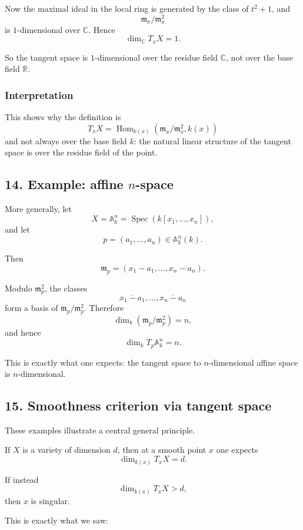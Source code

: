 \documentclass[12pt,a4paper]{article}
\theoremstyle{plain}
\theoremstyle{definition}      %
\begin{document}
	Now the maximal ideal in the local ring is generated by the class of \(t^2+1\), and
	\[
	\mathfrak m_x/\mathfrak m_x^2
	\]
	is \(1\)-dimensional over \(\mathbb C\). Hence
	\[
	\dim_{\mathbb C} T_xX=1.
	\]
	
	So the tangent space is \(1\)-dimensional over the residue field \(\mathbb C\), not over the base field \(\mathbb R\).
	
	\subsubsection*{Interpretation}
	
	This shows why the definition is
	\[
	T_xX=\operatorname{Hom}_{k(x)}(\mathfrak m_x/\mathfrak m_x^2,k(x))
	\]
	and not always over the base field \(k\): the natural linear structure of the tangent space is over the residue field of the point.
	
	\subsection*{14. Example: affine \(n\)-space}
	
	More generally, let
	\[
	X=\mathbb A_k^n=\operatorname{Spec}(k[x_1,\dots,x_n]),
	\]
	and let
	\[
	p=(a_1,\dots,a_n)\in \mathbb A_k^n(k).
	\]
	
	Then
	\[
	\mathfrak m_p=(x_1-a_1,\dots,x_n-a_n).
	\]
	
	Modulo \(\mathfrak m_p^2\), the classes
	\[
	\overline{x_1-a_1},\dots,\overline{x_n-a_n}
	\]
	form a basis of \(\mathfrak m_p/\mathfrak m_p^2\). Therefore
	\[
	\dim_k(\mathfrak m_p/\mathfrak m_p^2)=n,
	\]
	and hence
	\[
	\dim_k T_p\mathbb A_k^n=n.
	\]
	
	This is exactly what one expects: the tangent space to \(n\)-dimensional affine space is \(n\)-dimensional.
	
	\subsection*{15. Smoothness criterion via tangent space}
	
	These examples illustrate a central general principle.
	
	If \(X\) is a variety of dimension \(d\), then at a smooth point \(x\) one expects
	\[
	\dim_{k(x)} T_xX=d.
	\]
	
	If instead
	\[
	\dim_{k(x)}T_xX>d,
	\]
	then \(x\) is singular.
	
	This is exactly what we saw:
	
\end{document}
